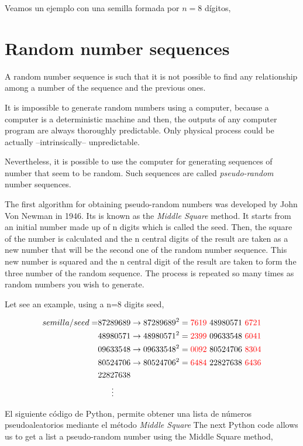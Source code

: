 \begin{paracol}{2}
Veamos un ejemplo con una semilla  formada por $n=8$ dígitos,
\switchcolumn
\section{Random number sequences}
A random number sequence is such that it is not possible to find any relationship among a number of the sequence and the previous ones.

It is impossible to generate random numbers using a computer, because a computer is a deterministic machine and then, the outputs of any computer program are always thoroughly predictable. Only physical process could be actually --intrinsically-- unpredictable.

Nevertheless, it is possible to use the computer for generating sequences of number that seem to be random. Such sequences are called \emph{pseudo-random} number sequences.

The first algorithm for obtaining pseudo-random numbers was developed by John Von Newman in 1946. Its is known as the \emph{Middle Square} method. It starts from an initial number made up of n digits which is called the seed. Then, the square of the number is calculated and the n central digits of the result are taken as a new number that will be the second one of the random number sequence. This new number is squared and the n central digit of the result are taken to form the three number of the random sequence. The process is repeated so many times as random numbers you wish to generate.

Let see an example, using a n=8 digits seed, 

\end{paracol}
\begin{align*}
semilla/seed=&87289689 \rightarrow
87289689^2={\color{red}7619}\ 48980571\ {\color{red}6721}\\
&48980571\rightarrow
48980571^2={\color{red}2399}\ 09633548\ {\color{red}6041}\\
&09633548 \rightarrow
09633548^2={\color{red}0092}\ 80524706\ {\color{red}8304}\\
&80524706 \rightarrow
80524706^2={\color{red}6484}\ 22827638\ {\color{red}6436}\\
&22827638\\
&\ \ \ \ \ \vdots
\end{align*}
\begin{paracol}{2}
El siguiente código de Python, permite obtener una lista de números pseudoaleatorios mediante el método \emph{Middle Square}
\switchcolumn
The next Python code allows us to get a list a pseudo-random number using the Middle Square method,
\end{paracol}

